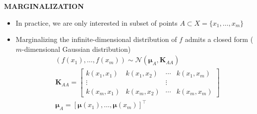 \begin{whitebox}{\textbf{MARGINALIZATION}}
    \begin{itemize}
        \item In practice, we are only interested in subset of points $A\subset X=\{x_1,\dots,x_m\}$
        \item Marginalizing the infinite-dimensional distribution of $f$ admits a closed form ($m$-dimensional Gaussian distribution)
        \begin{align*}
            &(f(x_1),\dots,f(x_m))\sim\mathcal{N}(\bm{\mu}_A,\bm{K}_{AA})\\
            &\bm{K}_{AA}=
            \begin{bmatrix}
                k(x_1,x_1) & k(x_1,x_2) & \cdots & k(x_1,x_m)\\
                \vdots & & \vdots\\
                k(x_m,x_1) & k(x_m,x_2) & \cdots & k(x_m,x_m)
            \end{bmatrix}\\
            &\bm{\mu}_A=[\bm{\mu}(x_1),\dots,\bm{\mu}(x_m)]^\top
        \end{align*}
    \end{itemize}
\end{whitebox}

